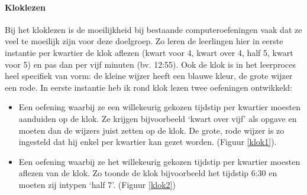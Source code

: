 \documentclass[a4paper,11pt]{article}
\theoremstyle{definition}
\begin{document}
\begin{itemize}
\begin{itemize}
\paragraph{Kloklezen}
\noindent Bij het kloklezen is de moeilijkheid bij bestaande computeroefeningen vaak dat 
ze veel te moeilijk zijn voor deze doelgroep. Zo leren de leerlingen hier in eerste instantie per 
kwartier de klok aflezen (kwart voor 4, kwart over 4, half 5, kwart voor 5) en 
pas dan per vijf minuten (bv. 12:55). Ook de klok is in het leerproces heel specifiek  
van vorm: de kleine wijzer heeft een blauwe kleur, de grote wijzer een rode. In 
eerste instantie heb ik rond klok lezen twee oefeningen ontwikkeld:
\begin{itemize}
  \item Een oefening waarbij ze een willekeurig gekozen tijdstip per kwartier moesten aanduiden op 
  de klok. Ze krijgen bijvoorbeeld `kwart over vijf' als opgave en moeten dan 
 de wijzers juist zetten op de klok. De grote, rode wijzer is zo ingesteld dat 
 hij enkel per kwartier kan gezet worden. (Figuur \ref{klok1}).
 \item Een oefening waarbij ze het willekeurig gekozen tijdstip per kwartier moesten aflezen van de 
 klok. Zo toonde de klok bijvoorbeeld het tijdstip 6:30 en moeten zij intypen 
 `half 7'. (Figuur \ref{klok2})
\end{itemize}
\begin{figure}[h!]
        \centering
        \begin{subfigure}{.5\textwidth}
          \centering

\end{subfigure}
\end{figure}
\end{itemize}
\end{itemize}
\end{document}
